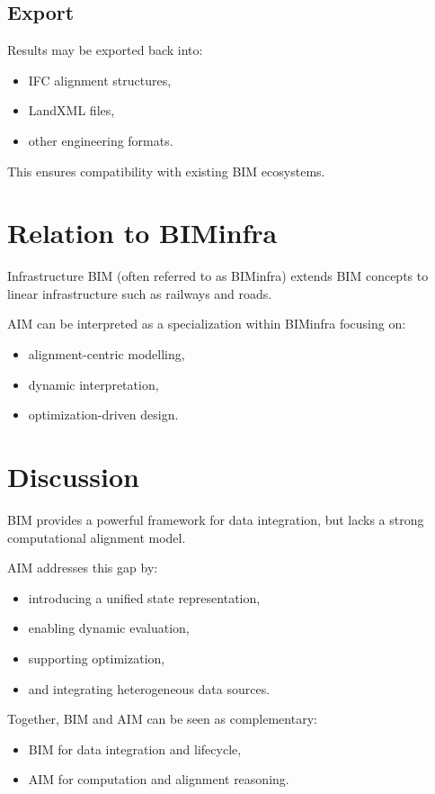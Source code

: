 \subsection{Export}

Results may be exported back into:
\begin{itemize}
\item IFC alignment structures,
\item LandXML files,
\item other engineering formats.
\end{itemize}

This ensures compatibility with existing BIM ecosystems.


\section{Relation to BIMinfra}

Infrastructure BIM (often referred to as BIMinfra) extends BIM concepts
to linear infrastructure such as railways and roads.

AIM can be interpreted as a specialization within BIMinfra focusing on:
\begin{itemize}
\item alignment-centric modelling,
\item dynamic interpretation,
\item optimization-driven design.
\end{itemize}


\section{Discussion}

BIM provides a powerful framework for data integration, but lacks a
strong computational alignment model.

AIM addresses this gap by:
\begin{itemize}
\item introducing a unified state representation,
\item enabling dynamic evaluation,
\item supporting optimization,
\item and integrating heterogeneous data sources.
\end{itemize}

Together, BIM and AIM can be seen as complementary:
\begin{itemize}
\item BIM for data integration and lifecycle,
\item AIM for computation and alignment reasoning.
\end{itemize}


